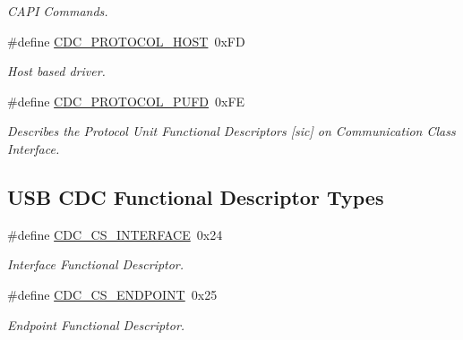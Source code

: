 \begin{DoxyCompactItemize}
\begin{DoxyCompactList}\small\item\em C\-A\-P\-I Commands. \end{DoxyCompactList}\item 
\hypertarget{group__cdc__protocol__group_gae3fb87c639e467c9e9a1cab674a53463}{\#define \hyperlink{group__cdc__protocol__group_gae3fb87c639e467c9e9a1cab674a53463}{C\-D\-C\-\_\-\-P\-R\-O\-T\-O\-C\-O\-L\-\_\-\-H\-O\-S\-T}~0x\-F\-D}\label{group__cdc__protocol__group_gae3fb87c639e467c9e9a1cab674a53463}

\begin{DoxyCompactList}\small\item\em Host based driver. \end{DoxyCompactList}\item 
\hypertarget{group__cdc__protocol__group_gaa4704c0876c47f0fc9b4e1e2812a746c}{\#define \hyperlink{group__cdc__protocol__group_gaa4704c0876c47f0fc9b4e1e2812a746c}{C\-D\-C\-\_\-\-P\-R\-O\-T\-O\-C\-O\-L\-\_\-\-P\-U\-F\-D}~0x\-F\-E}\label{group__cdc__protocol__group_gaa4704c0876c47f0fc9b4e1e2812a746c}

\begin{DoxyCompactList}\small\item\em Describes the Protocol Unit Functional Descriptors \mbox{[}sic\mbox{]} on Communication Class Interface. \end{DoxyCompactList}\end{DoxyCompactItemize}
\subsection*{U\-S\-B C\-D\-C Functional Descriptor Types}
\begin{DoxyCompactItemize}
\item 
\hypertarget{group__cdc__protocol__group_gafe0ca40b5aacc5c750f952af952583d2}{\#define \hyperlink{group__cdc__protocol__group_gafe0ca40b5aacc5c750f952af952583d2}{C\-D\-C\-\_\-\-C\-S\-\_\-\-I\-N\-T\-E\-R\-F\-A\-C\-E}~0x24}\label{group__cdc__protocol__group_gafe0ca40b5aacc5c750f952af952583d2}

\begin{DoxyCompactList}\small\item\em Interface Functional Descriptor. \end{DoxyCompactList}\item 
\hypertarget{group__cdc__protocol__group_gae07e10978a48ff63df33c3aeedf84c3a}{\#define \hyperlink{group__cdc__protocol__group_gae07e10978a48ff63df33c3aeedf84c3a}{C\-D\-C\-\_\-\-C\-S\-\_\-\-E\-N\-D\-P\-O\-I\-N\-T}~0x25}\label{group__cdc__protocol__group_gae07e10978a48ff63df33c3aeedf84c3a}

\begin{DoxyCompactList}\small\item\em Endpoint Functional Descriptor. \end{DoxyCompactList}\end{DoxyCompactItemize}
